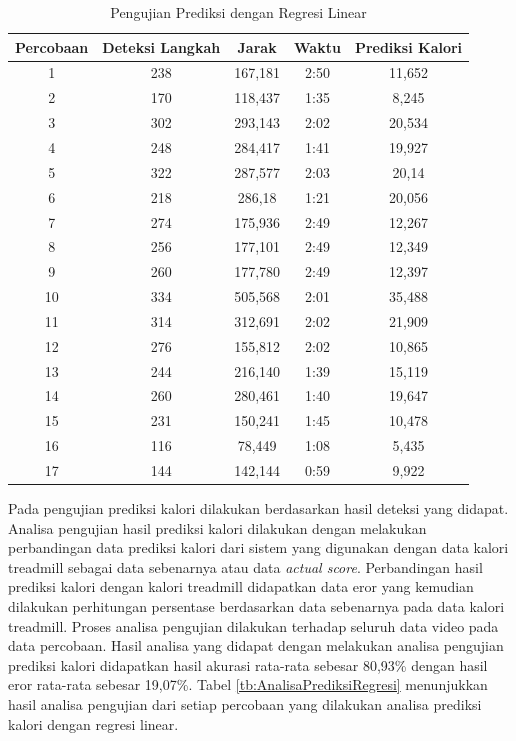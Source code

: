 \begin{longtable}{|c|c|c|c|c|}
  \caption{Pengujian Prediksi dengan Regresi Linear}
  \label{tb:PengujianPrediksiRegresi}                                   \\
  \hline
  \rowcolor[HTML]{C0C0C0}
  \textbf{Percobaan} & \textbf{Deteksi Langkah} & \textbf{Jarak} & \textbf{Waktu} & \textbf{Prediksi Kalori} \\
  \hline
  1   & 238   & 167,181    & 2:50    & 11,652  \\
  \hline
  2   & 170   & 118,437    & 1:35    & 8,245   \\
  \hline
  3   & 302   & 293,143    & 2:02    & 20,534  \\
  \hline
  4   & 248   & 284,417    & 1:41    & 19,927  \\
  \hline
  5   & 322   & 287,577    & 2:03    & 20,14   \\
  \hline
  6   & 218   & 286,18     & 1:21    & 20,056  \\
  \hline
  7   & 274   & 175,936    & 2:49    & 12,267  \\
  \hline
  8   & 256   & 177,101    & 2:49    & 12,349  \\
  \hline
  9   & 260   & 177,780    & 2:49    & 12,397  \\
  \hline
  10   & 334   & 505,568   & 2:01    & 35,488  \\
  \hline
  11   & 314   & 312,691   & 2:02    & 21,909  \\
  \hline
  12   & 276   & 155,812   & 2:02    & 10,865  \\
  \hline
  13   & 244   & 216,140   & 1:39    & 15,119  \\
  \hline
  14   & 260   & 280,461   & 1:40    & 19,647  \\
  \hline
  15   & 231   & 150,241   & 1:45    & 10,478  \\
  \hline
  16   & 116   & 78,449    & 1:08    & 5,435  \\
  \hline
  17   & 144   & 142,144   & 0:59    & 9,922  \\
  \hline
\end{longtable}

Pada pengujian prediksi kalori dilakukan berdasarkan hasil deteksi yang didapat. Analisa pengujian hasil prediksi kalori dilakukan dengan melakukan perbandingan data prediksi kalori dari sistem yang digunakan dengan data kalori treadmill sebagai data sebenarnya atau data \emph{actual score}. Perbandingan hasil prediksi kalori dengan kalori treadmill didapatkan data eror yang kemudian dilakukan perhitungan persentase berdasarkan data sebenarnya pada data kalori treadmill. Proses analisa pengujian dilakukan terhadap seluruh data video pada data percobaan. Hasil analisa yang didapat dengan melakukan analisa pengujian prediksi kalori didapatkan hasil akurasi rata-rata sebesar 80,93\% dengan hasil eror rata-rata sebesar 19,07\%. Tabel \ref{tb:AnalisaPrediksiRegresi} menunjukkan hasil analisa pengujian dari setiap percobaan yang dilakukan analisa prediksi kalori dengan regresi linear.

